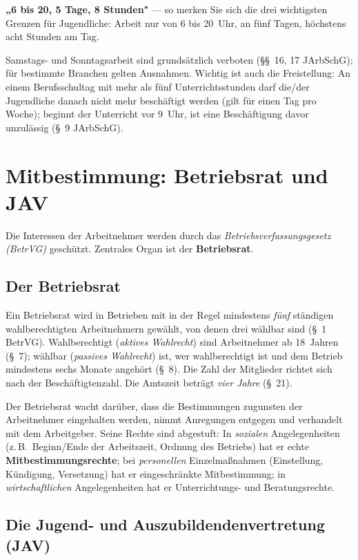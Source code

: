 \documentclass[11pt, a4paper]{article}
\begin{document}
\begin{eselsbruecke}
\textbf{„6 bis 20, 5 Tage, 8 Stunden"} --- so merken Sie sich die drei wichtigsten Grenzen
für Jugendliche: Arbeit nur von 6 bis 20~Uhr, an fünf Tagen, höchstens acht Stunden am Tag.
\end{eselsbruecke}

Samstags- und Sonntagsarbeit sind grundsätzlich verboten (\S\S~16, 17 JArbSchG); für bestimmte
Branchen gelten Ausnahmen. Wichtig ist auch die Freistellung: An einem Berufsschultag mit mehr
als fünf Unterrichtsstunden darf die/der Jugendliche danach nicht mehr beschäftigt werden
(gilt für einen Tag pro Woche); beginnt der Unterricht vor 9~Uhr, ist eine Beschäftigung davor
unzulässig (\S~9 JArbSchG).

\section{Mitbestimmung: Betriebsrat und JAV}

Die Interessen der Arbeitnehmer werden durch das \emph{Betriebsverfassungsgesetz (BetrVG)}
geschützt. Zentrales Organ ist der \textbf{Betriebsrat}.

\subsection{Der Betriebsrat}

Ein Betriebsrat wird in Betrieben mit in der Regel mindestens \emph{fünf} ständigen
wahlberechtigten Arbeitnehmern gewählt, von denen drei wählbar sind (\S~1 BetrVG).
Wahlberechtigt (\emph{aktives Wahlrecht}) sind Arbeitnehmer ab 18~Jahren (\S~7); wählbar
(\emph{passives Wahlrecht}) ist, wer wahlberechtigt ist und dem Betrieb mindestens sechs
Monate angehört (\S~8). Die Zahl der Mitglieder richtet sich nach der Beschäftigtenzahl. Die
Amtszeit beträgt \emph{vier Jahre} (\S~21).

Der Betriebsrat wacht darüber, dass die Bestimmungen zugunsten der Arbeitnehmer eingehalten
werden, nimmt Anregungen entgegen und verhandelt mit dem Arbeitgeber. Seine Rechte sind
abgestuft: In \emph{sozialen} Angelegenheiten (z.\,B.\ Beginn/Ende der Arbeitszeit, Ordnung des
Betriebs) hat er echte \textbf{Mitbestimmungsrechte}; bei \emph{personellen} Einzelmaßnahmen
(Einstellung, Kündigung, Versetzung) hat er eingeschränkte Mitbestimmung; in
\emph{wirtschaftlichen} Angelegenheiten hat er Unterrichtungs- und Beratungsrechte.

\subsection{Die Jugend- und Auszubildendenvertretung (JAV)}
\end{document}
